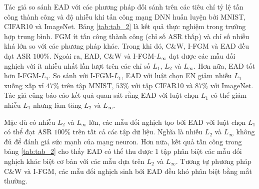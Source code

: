 Tác giả so sánh EAD với các phương pháp đối sánh trên các tiêu chí tỷ lệ tấn công thành công và độ nhiễu khi tấn công mạng DNN huấn luyện bởi MNIST, CIFAR10 và ImageNet. Bảng \ref{tab:tab_2} là kết quả thực nghiệm trong trường hợp trung bình. FGM ít tấn công thành công (chỉ số ASR thấp) và chỉ số nhiễu khá lớn so với các phương pháp khác. Trong khi đó, C\&W, I-FGM và EAD đều đạt ASR $100\%$. Ngoài ra, EAD, C\&W và I-FGM-$L_{\infty}$ đạt được các mẫu đối nghịch với ít nhiễu nhất lần lượt trên các chỉ số  $L_1$, $L_2$ và $L_{\infty}$. Hơn nữa, EAD tốt hơn I-FGM-$L_1$. So sánh với I-FGM-$L_1$, EAD với luật chọn EN giảm nhiễu $L_1$ xuống xấp xỉ $47\%$ trên tập MNIST, $53\%$ với tập CIFAR10 và $87\%$ với ImageNet. Tác giả cũng báo cáo kết quả quan sát rằng EAD với luật chọn $L_1$ có thể giảm nhiễu $L_1$ nhưng làm tăng $L_2$ và $L_{\infty}$.


Mặc dù có nhiễu $L_2$ và $L_{\infty}$ lớn, các mẫu đối nghịch tạo bởi EAD với luật chọn $L_1$ có thể đạt ASR $100\%$ trên tất cả các tập dữ liệu. Nghĩa là nhiễu $L_2$ và $L_{\infty}$ không đủ để đánh giá sức mạnh của mạng neuron. Hơn nữa, kết quả tấn công trong bảng \ref{tab:tab_2} cho thấy EAD có thể thu được 1 tập phân biệt các mẫu đối nghịch khác biệt cơ bản với các mẫu dựa trên $L_2$ và $L_{\infty}$. Tương tự phương pháp C\&W và I-FGM, các mẫu đối nghịch sinh bởi EAD đều khó phân biệt bằng mắt thường. 
